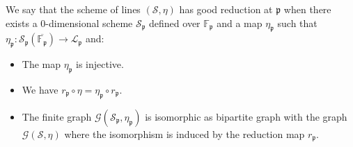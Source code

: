\documentclass{article}
\theoremstyle{plain}
\theoremstyle{definition}
\numberwithin{equation}{section}
\begin{document}
We say that the scheme of lines $(\mathcal{S},\eta)$ has good reduction at $\mathfrak{p}$ when there exists a $0$-dimensional scheme $\mathcal{S}_{\mathfrak{p}}$ defined over $\mathbb{F}_{\mathfrak{p}}$ and a map $\eta_{\mathfrak{p}}$ such that $\eta_{\mathfrak{p}}: \mathcal{S}_{\mathfrak{p}}(\overline{\mathbb{F}_{\mathfrak{p}}})\rightarrow \mathcal{L}_{\mathfrak{p}}$ and:
\begin{itemize}
	\item The map $\eta_{\mathfrak{p}}$ is injective. 
	\item We have $r_{\mathfrak{p}}\circ\eta = \eta_{\mathfrak{p}}\circ r_{\mathfrak{p}}$.
	\item The finite graph $\mathcal{G}(\mathcal{S}_{\mathfrak{p}},\eta_{\mathfrak{p}})$ is isomorphic as bipartite graph with the graph $\mathcal{G}(\mathcal{S},\eta)$ where the isomorphism is induced by the reduction map $r_{\mathfrak{p}}$. 
\end{itemize}
\end{document}
